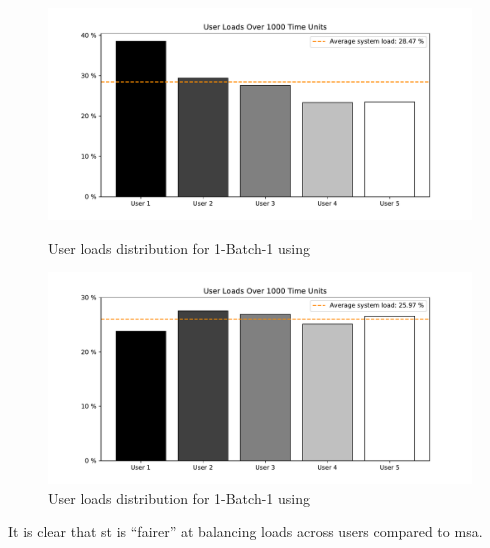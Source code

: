 \documentclass[draft=false]{seal_thesis}
\begin{document}
\begin{figure}[!ht]
	\centering
	\begin{minipage}[b]{0.45\textwidth}
		\includegraphics[width=\textwidth]{img/1_BATCHONE_MSA_NU5_GI3_SIM1000_FAIR}
		\caption{User loads distribution for 1-Batch-1 using }
		\label{fig:msa_fairness}
	\end{minipage}
	\hfill
	\begin{minipage}[b]{0.45\textwidth}
		\includegraphics[width=\textwidth]{img/1_BATCHONE_ST_NU5_GI3_SIM1000_FAIR}
		\caption{User loads distribution for 1-Batch-1 using }
		\label{fig:st_fairness}
	\end{minipage}
\end{figure}

It is clear that \gls{st} is ``fairer'' at balancing loads across users compared to \gls{msa}. 

\subsection{}
\label{subsec:rl_discussion}
\end{document}

